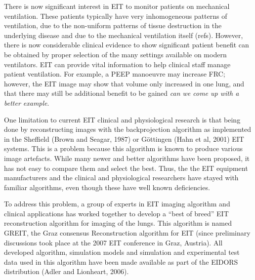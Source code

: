 \documentclass[12pt]{iopart}
\begin{document}
There is now significant interest in EIT to 
monitor patients on mechanical ventilation. These patients
typically have very inhomogeneous patterns of ventilation,
due to the non-uniform patterns of tissue destruction
in the underlying disease and due to the mechanical ventilation
itself (refs). However, there is now considerable clinical
evidence to show significant patient benefit can be obtained
by proper selection of the many settings
available on modern ventilators. EIT can provide vital 
information to help clinical staff manage patient ventilation.
For example, a PEEP manoeuvre may increase FRC; however, the
EIT image may show that volume only increased in one lung, and
that there may still be additional benefit to be gained 
{\em can we come up with a better example}.

One limitation to current EIT clinical and physiological research
is that being done by reconstructing images with the backprojection
algorithm as implemented
in the Sheffield (Brown and Seagar, 1987)
or G\"ottingen (Hahn et al, 2001) EIT systems. This is a 
problem because this algorithm is known to produce various
image artefacts.
While many newer and better algorithms have been proposed, it has
not easy  to compare them and select the best. Thus, the
the EIT equipment manufacturers and the clinical and physiological
researchers have stayed with familiar algorithms, even though
these have well known deficiencies. 

To address this problem, a group of experts in EIT imaging
algorithm and clinical applications has worked together to
develop a ``best of breed'' EIT reconstruction algorithm
for imaging of the lungs. This algorithm is named GREIT, 
the Graz consensus Reconstruction algorithm for EIT (since
preliminary discussions took place at the 2007 EIT conference
in Graz, Austria). All developed algorithm, simulation
models and simulation and experimental test data used
in this algorithm have been made available as part of
the EIDORS distribution (Adler and Lionheart, 2006).
\end{document}
